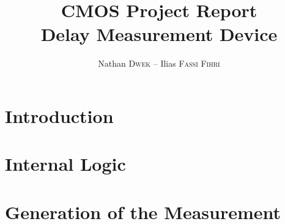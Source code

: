 
\title{CMOS Project Report\\Delay Measurement Device}
\author{Nathan \textsc{Dwek} -- Ilias \textsc{Fassi Fihri}}


\maketitle
\tableofcontents
\clearpage
\hypersetup{allcolors=link}
\section{Introduction}


\section{Internal Logic}


\section{Generation of the Measurement}



